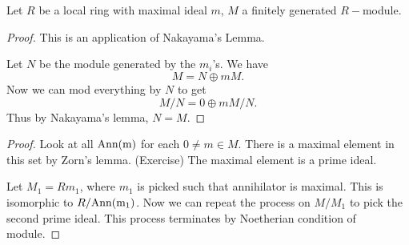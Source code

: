 \section{}
Let $R$ be a local ring with maximal ideal $m$, $M$ a finitely generated $R-$module. 
\begin{proof}
    This is an application of Nakayama's Lemma. 

    Let $N$ be the module generated by the $m_i$'s. We have \[
    M= N \oplus mM.
    \]
    Now we can mod everything by $N$ to get \[
    M/N = 0 \oplus m M/N.
    \]
    Thus by Nakayama's lemma, $N=M$.
\end{proof}
\begin{proof}
    Look at all $\rm{Ann(m)}$ for each $0\neq m\in M$. There is a maximal element in this set by Zorn's lemma. (Exercise) The maximal element is a prime ideal. 

    Let $M_1=R m_1$, where $m_1$ is picked such that annihilator is maximal. This is isomorphic to $R/\rm{Ann}(m_1)$.
    Now we can repeat the process on $M/M_1$ to pick the second prime ideal. This process terminates by Noetherian condition of module. 
\end{proof}


